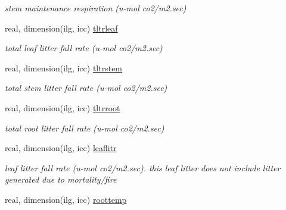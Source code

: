 \begin{DoxyCompactItemize}
\begin{DoxyCompactList}\small\item\em stem maintenance respiration (u-\/mol co2/m2.\+sec) \end{DoxyCompactList}\item 
\hypertarget{structctem__statevars_1_1veg__gat_ababfafd8378206f61965b85291457a28}{}real, dimension(ilg, icc) \hyperlink{structctem__statevars_1_1veg__gat_ababfafd8378206f61965b85291457a28}{tltrleaf}\label{structctem__statevars_1_1veg__gat_ababfafd8378206f61965b85291457a28}

\begin{DoxyCompactList}\small\item\em total leaf litter fall rate (u-\/mol co2/m2.\+sec) \end{DoxyCompactList}\item 
\hypertarget{structctem__statevars_1_1veg__gat_a07ded7130846dd276cc9cdff3f9da34b}{}real, dimension(ilg, icc) \hyperlink{structctem__statevars_1_1veg__gat_a07ded7130846dd276cc9cdff3f9da34b}{tltrstem}\label{structctem__statevars_1_1veg__gat_a07ded7130846dd276cc9cdff3f9da34b}

\begin{DoxyCompactList}\small\item\em total stem litter fall rate (u-\/mol co2/m2.\+sec) \end{DoxyCompactList}\item 
\hypertarget{structctem__statevars_1_1veg__gat_a0afe34600573e036f0d2b7c8a9af5244}{}real, dimension(ilg, icc) \hyperlink{structctem__statevars_1_1veg__gat_a0afe34600573e036f0d2b7c8a9af5244}{tltrroot}\label{structctem__statevars_1_1veg__gat_a0afe34600573e036f0d2b7c8a9af5244}

\begin{DoxyCompactList}\small\item\em total root litter fall rate (u-\/mol co2/m2.\+sec) \end{DoxyCompactList}\item 
\hypertarget{structctem__statevars_1_1veg__gat_a249db9e49e7ad29f163ba0849436a099}{}real, dimension(ilg, icc) \hyperlink{structctem__statevars_1_1veg__gat_a249db9e49e7ad29f163ba0849436a099}{leaflitr}\label{structctem__statevars_1_1veg__gat_a249db9e49e7ad29f163ba0849436a099}

\begin{DoxyCompactList}\small\item\em leaf litter fall rate (u-\/mol co2/m2.\+sec). this leaf litter does not include litter generated due to mortality/fire \end{DoxyCompactList}\item 
\hypertarget{structctem__statevars_1_1veg__gat_ae3140f26f6648fe0797f0ad1cf856d34}{}real, dimension(ilg, icc) \hyperlink{structctem__statevars_1_1veg__gat_ae3140f26f6648fe0797f0ad1cf856d34}{roottemp}\label{structctem__statevars_1_1veg__gat_ae3140f26f6648fe0797f0ad1cf856d34}


\end{DoxyCompactItemize}

